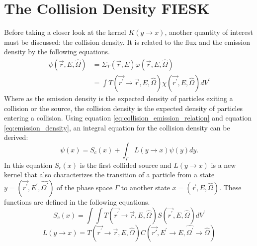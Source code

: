 \section{The Collision Density FIESK}
Before taking a closer look at the kernel $K(y \to x)$, another quantity of 
interest must be discussed: the collision density. It is related to the
flux and the emission density by the following equations.
\begin{align}
  \psi(\vec{r},E,\hat{\Omega}) & = \Sigma_T(\vec{r},E)
  \varphi(\vec{r},E,\hat{\Omega}) \\
  & = \int T(\vec{r^{'}} \to \vec{r},E,\hat{\Omega})
  \chi(\vec{r^{'}},E,\hat{\Omega})dV^{'}
  \label{eq:collision_emission_relation}
\end{align}
Where as the emission density is the expected density of particles exiting a 
collision or the source, the collision density is the expected density of 
particles entering a collision. Using equation 
\ref{eq:collision_emission_relation} and equation \ref{eq:emission_density}, an 
integral equation for the collision density can be derived:
\begin{equation*}
  \psi(x) = S_c(x) + \int_{\Gamma} L(y \to x)\psi(y)dy.
\end{equation*}
In this equation $S_c(x)$ is the first collided source and $L(y \to x)$ is
a new kernel that also characterizes the transition of a particle from a state 
$y = (\vec{r^{'}},E^{'},\hat{\Omega^{'}})$ of the phase space $\Gamma$ to another 
state $x = (\vec{r},E,\hat{\Omega})$. These functions are defined in the 
following equations.
\begin{equation}
  S_c(x) = \int\int T(\vec{r^{'}} \to \vec{r},E,\hat{\Omega})
  S(\vec{r^{'}},E,\hat{\Omega})dV^{'}
\end{equation}
\begin{equation}
  L(y \to x) =
  T(\vec{r^{'}} \to \vec{r},E,\hat{\Omega})
  C(\vec{r'},E^{'} \to E,\hat{\Omega^{'}} \to \hat{\Omega})
\end{equation}

